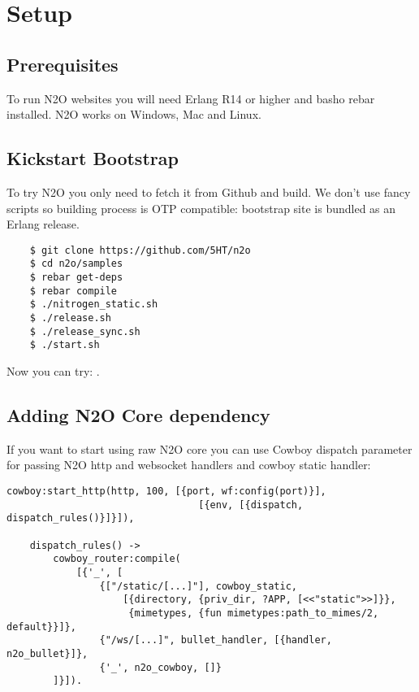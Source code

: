 \section{Setup}

\subsection{Prerequisites}
To run N2O websites you will need Erlang R14 or higher and basho rebar installed.
N2O works on Windows, Mac and Linux.

\subsection{Kickstart Bootstrap}
To try N2O you only need to fetch it from Github and build. We don't use
fancy scripts so building process is OTP compatible: bootstrap site
is bundled as an Erlang release.

\vspace{1\baselineskip}
\begin{lstlisting}
    $ git clone https://github.com/5HT/n2o
    $ cd n2o/samples
    $ rebar get-deps
    $ rebar compile
    $ ./nitrogen_static.sh
    $ ./release.sh
    $ ./release_sync.sh
    $ ./start.sh
\end{lstlisting}
\vspace{1\baselineskip}

Now you can try: .

\newpage
\subsection{Adding N2O Core dependency}
If you want to start using raw N2O core you can use Cowboy dispatch parameter
for passing N2O http and websocket handlers and cowboy static handler:

\begin{lstlisting}[caption=web\_sup.erl]
    cowboy:start_http(http, 100, [{port, wf:config(port)}],
                                 [{env, [{dispatch, dispatch_rules()}]}]),

    dispatch_rules() ->
        cowboy_router:compile(
            [{'_', [
                {["/static/[...]"], cowboy_static,
                    [{directory, {priv_dir, ?APP, [<<"static">>]}},
                     {mimetypes, {fun mimetypes:path_to_mimes/2, default}}]}, 
                {"/ws/[...]", bullet_handler, [{handler, n2o_bullet}]},
                {'_', n2o_cowboy, []}
        ]}]).
\end{lstlisting}


